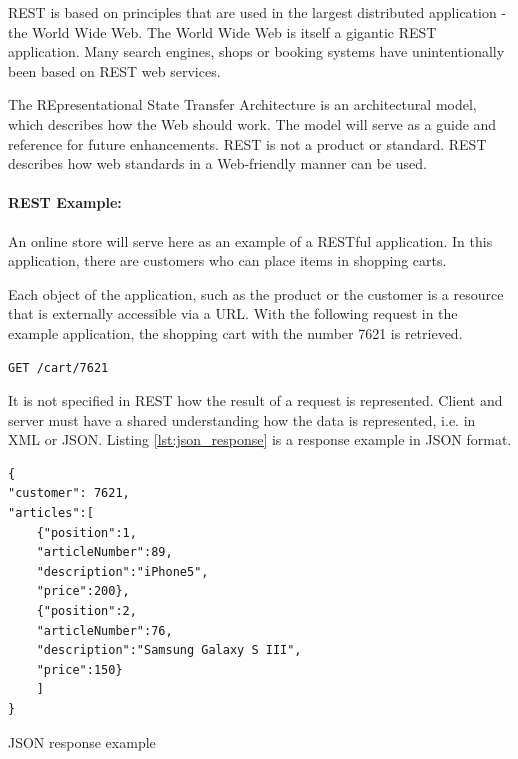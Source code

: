 \ac{REST} is based on principles that are used in the largest distributed application - the World Wide Web. The World Wide Web is itself a gigantic \ac{REST} application. Many search engines, shops or booking systems have unintentionally been based on \ac{REST} web services.

The REpresentational State Transfer Architecture is an architectural model, which describes how the Web should work. The model will serve as a guide and reference for future enhancements. \ac{REST} is not a product or standard. \ac{REST} describes how web standards in a Web-friendly manner can be used.


\paragraph{REST Example:} An online store will serve here as an example of a RESTful application. In this application, there are customers who can place items in shopping carts.

Each object of the application, such as the product or the customer is a resource that is externally accessible via a \ac{URL}. With the following request in the example application, the shopping cart with the number 7621 is retrieved.

\begin{code}
\begin{verbatim}
GET /cart/7621
\end{verbatim}
\end{code}


It is not specified in \ac{REST} how the result of a request is represented. Client and server must have a shared understanding how the data is represented, i.e. in \ac{XML} or \ac{JSON}. Listing \ref{lst:json_response} is a response example in \ac{JSON} format.

\begin{code}
\begin{verbatim}
{
"customer": 7621,
"articles":[
	{"position":1,
	"articleNumber":89,
	"description":"iPhone5",
	"price":200},
	{"position":2,
	"articleNumber":76,
	"description":"Samsung Galaxy S III",
	"price":150}
	]
}
\end{verbatim}
\caption{\ac{JSON} response example}
\label{lst:json_response}
\end{code}

